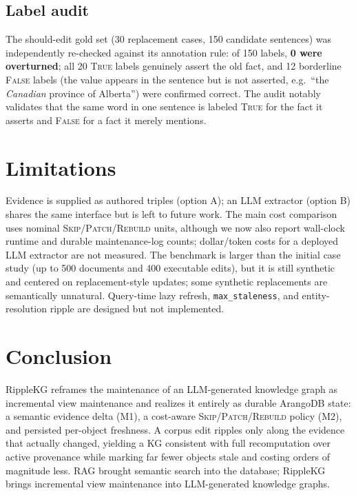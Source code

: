 \documentclass[conference]{IEEEtran}
\begin{document}
\subsection{Label audit}
The should-edit gold set (30 replacement cases, 150 candidate sentences) was
independently re-checked against its annotation rule: of 150 labels,
\textbf{0 were overturned}; all 20 \textsc{True} labels genuinely assert the old
fact, and 12 borderline \textsc{False} labels (the value appears in the sentence
but is not asserted, e.g.\ ``the \emph{Canadian} province of Alberta'') were
confirmed correct. The audit notably validates that the same word in one sentence
is labeled \textsc{True} for the fact it asserts and \textsc{False} for a fact it
merely mentions.

\section{Limitations}
Evidence is supplied as authored triples (option A); an LLM extractor (option B)
shares the same interface but is left to future work. The main cost comparison
uses nominal \textsc{Skip}/\textsc{Patch}/\textsc{Rebuild} units, although we now
also report wall-clock runtime and durable maintenance-log counts; dollar/token
costs for a deployed LLM extractor are not measured. The benchmark is larger
than the initial case study (up to 500 documents and 400 executable edits), but
it is still synthetic and centered on replacement-style updates; some synthetic
replacements are semantically unnatural. Query-time lazy refresh,
\texttt{max\_staleness}, and entity-resolution ripple are designed but not
implemented.

\section{Conclusion}
RippleKG reframes the maintenance of an LLM-generated knowledge graph as
incremental view maintenance and realizes it entirely as durable ArangoDB state:
a semantic evidence delta (M1), a cost-aware
\textsc{Skip}/\textsc{Patch}/\textsc{Rebuild} policy (M2), and persisted per-object
freshness. A corpus edit ripples only along the evidence that actually changed,
yielding a KG consistent with full recomputation over active provenance while
marking far fewer objects stale and costing orders of magnitude less. RAG brought semantic search
into the database; RippleKG brings incremental view maintenance into
LLM-generated knowledge graphs.
\end{document}

